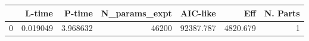 \begin{tabular}{lrrrrrr}
\toprule
{} &    L-time &    P-time &  N\_params\_expt &   AIC-like &       Eff &  N. Parts \\
\midrule
0 &  0.019049 &  3.968632 &          46200 &  92387.787 &  4820.679 &         1 \\
\bottomrule
\end{tabular}
